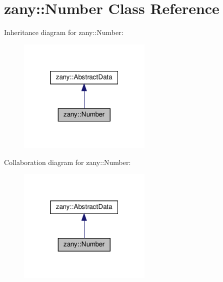 \hypertarget{classzany_1_1_number}{}\section{zany\+:\+:Number Class Reference}
\label{classzany_1_1_number}


Inheritance diagram for zany\+:\+:Number\+:
\nopagebreak
\begin{figure}[H]
\begin{center}
\leavevmode
\includegraphics[width=181pt]{classzany_1_1_number__inherit__graph}
\end{center}
\end{figure}


Collaboration diagram for zany\+:\+:Number\+:
\nopagebreak
\begin{figure}[H]
\begin{center}
\leavevmode
\includegraphics[width=181pt]{classzany_1_1_number__coll__graph}
\end{center}
\end{figure}
